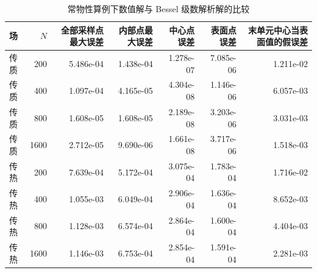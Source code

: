 \begin{table}[H]
\centering
\caption{常物性算例下数值解与 Bessel 级数解析解的比较}
\label{tab:analytic}
\footnotesize
\begin{tabular}{@{}lrrrrrr@{}}
\toprule
场 & $N$ & 全部采样点最大误差 & 内部点最大误差 & 中心点误差 & 表面点误差 & 末单元中心当表面值的假误差 \\
\midrule
传质 & 200 & 5.486e-04 & 1.438e-04 & 1.278e-07 & 7.085e-06 & 1.211e-02 \\
传质 & 400 & 1.097e-04 & 4.165e-05 & 4.304e-08 & 1.146e-06 & 6.057e-03 \\
传质 & 800 & 1.608e-05 & 1.608e-05 & 2.189e-08 & 3.203e-06 & 3.031e-03 \\
传质 & 1600 & 2.712e-05 & 9.690e-06 & 1.661e-08 & 3.717e-06 & 1.518e-03 \\
传热 & 200 & 7.639e-04 & 5.172e-04 & 3.075e-04 & 1.783e-04 & 1.716e-02 \\
传热 & 400 & 1.055e-03 & 6.049e-04 & 2.906e-04 & 1.636e-04 & 8.652e-03 \\
传热 & 800 & 1.128e-03 & 6.574e-04 & 2.864e-04 & 1.600e-04 & 4.404e-03 \\
传热 & 1600 & 1.146e-03 & 6.753e-04 & 2.854e-04 & 1.591e-04 & 2.281e-03 \\
\bottomrule
\end{tabular}
\end{table}
